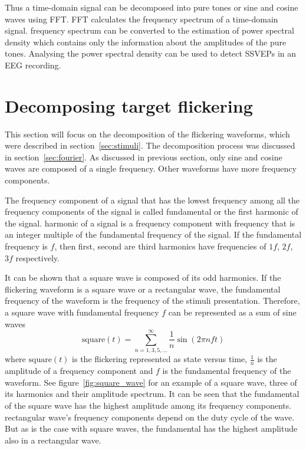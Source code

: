 Thus a time-domain signal can be decomposed into \glspl{pure tone} or sine and cosine waves using \gls{FFT}. \gls{FFT} calculates the \gls{frequency spectrum} of a time-domain signal. \Gls{frequency spectrum} can be converted to the estimation of \gls{power spectral density} which contains only the information about the amplitudes of the \glspl{pure tone}. Analysing the \gls{power spectral density} can be used to detect \glspl{SSVEP} in an \gls{EEG} recording.



\section{Decomposing target flickering}
\label{sec:decomposition}

This section will focus on the decomposition of the \glspl{flickering waveform}, which were described in section~\ref{sec:stimuli}. The decomposition process was discussed in section~\ref{sec:fourier}. As discussed in previous section, only sine and cosine waves are composed of a single frequency. Other waveforms have more \glspl{frequency component}.

The \gls{frequency component} of a signal that has the lowest frequency among all the \glspl{frequency component} of the signal is called \gls{fundamental} or the first \gls{harmonic} of the signal. \Gls{harmonic} of a signal is a \gls{frequency component} with frequency that is an integer multiple of the \gls{fundamental} frequency of the signal. If the \gls{fundamental} frequency is $f$, then first, second are third \glspl{harmonic} have frequencies of $1f$, $2f$, $3f$ respectively.

It can be shown that a \gls{square wave} is composed of its odd \glspl{harmonic}. If the \gls{flickering waveform} is a \gls{square wave} or a \gls{rectangular wave}, the \gls{fundamental} frequency of the waveform is the frequency of the stimuli presentation. Therefore, a \gls{square wave} with \gls{fundamental} frequency $f$ can be represented as a sum of sine waves
\begin{equation}
	\label{eq:square}
	\mbox{square}(t) = \sum_{n=1,3,5,\dots}^{\infty}\frac{1}{n} \sin(2\pi nft)
\end{equation}
where $\mbox{square}(t)$ is the \gls{flickering} represented as \gls{state} versus time, $\frac{1}{n}$ is the amplitude of a \gls{frequency component} and $f$ is the \gls{fundamental} frequency of the waveform. See figure~\ref{fig:square_wave} for an example of a \gls{square wave}, three of its \glspl{harmonic} and their amplitude spectrum. It can be seen that the \gls{fundamental} of the square wave has the highest amplitude among its \glspl{frequency component}. \Gls{rectangular wave}'s \glspl{frequency component} depend on the \gls{duty cycle} of the wave. But as is the case with \glspl{square wave}, the \gls{fundamental} has the highest amplitude also in a \gls{rectangular wave}.

